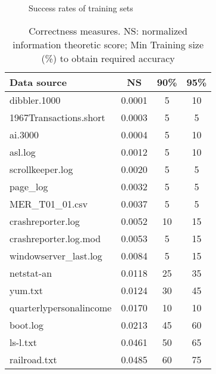 \begin{figure}
\caption{Success rates of training sets} \label{fig:trainsucc} \shrink
\end{figure}

\begin{table}
\begin{center}
\begin{tabular}{|l||c|c|c|} \hline
Data source		  & NS  			& 90\% 		& 95\% \\ \hline \hline
dibbler.1000            & 0.0001		& 5		& 10 \\ \hline
1967Transactions.short	& 0.0003		& 5		& 5 \\ \hline
ai.3000                 & 0.0004		& 5		& 10 \\ \hline
asl.log                 & 0.0012		& 5		& 10\\ \hline
scrollkeeper.log        & 0.0020		& 5		& 5\\ \hline
page\_log               & 0.0032		& 5		& 5\\ \hline
MER\_T01\_01.csv        & 0.0037		& 5		& 5 \\ \hline
crashreporter.log       & 0.0052		& 10		& 15\\ \hline
crashreporter.log.mod   & 0.0053		& 5		& 15\\ \hline
windowserver\_last.log  & 0.0084		& 5		& 15\\ \hline
netstat-an              & 0.0118		& 25		& 35\\ \hline
yum.txt                 & 0.0124		& 30		& 45\\ \hline
quarterlypersonalincome & 0.0170		& 10		& 10\\ \hline
boot.log                & 0.0213		& 45		& 60\\ \hline
ls-l.txt                & 0.0461		& 50		& 65 \\ \hline
railroad.txt            & 0.0485		& 60		& 75\\ \hline
\end{tabular}
\caption{Correctness measures.  NS: normalized information theoretic score;
Min Training size (\%) to obtain required accuracy} \shrink
\label{tab:correlate}
\end{center}
\end{table}



